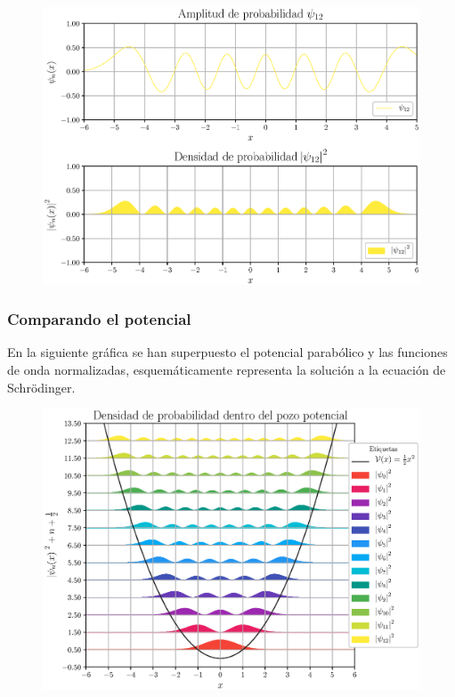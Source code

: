 \documentclass[12pt]{beamer}
\begin{document}
\begin{frame}[plain]
\begin{figure}[H]
    \centering
    \includegraphics[scale=0.5]{Imagenes/Funcion_Onda_012.eps}
\end{figure}
\end{frame}
\begin{frame}
\frametitle{Comparando el potencial}
En la siguiente gráfica se han superpuesto el potencial parabólico y las funciones de onda normalizadas, esquemáticamente representa la solución a la ecuación de Schrödinger.
\end{frame}
\begin{frame}[plain]
\begin{figure}[H]
    \centering
    \includegraphics[scale=0.5]{Imagenes/Funciones_Normalizadas_01.eps}
\end{figure}
\end{frame}
\end{document}
